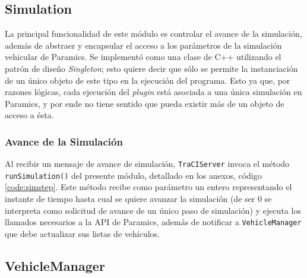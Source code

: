\subsection{Simulation}\label{sec:simulation}

La principal funcionalidad de este módulo es controlar el avance de la simulación, además de abstraer y encapsular el acceso a los parámetros de la simulación vehicular de Paramics. Se implementó como una clase de C++ utilizando el patrón de diseño \emph{Singleton}; esto quiere decir que sólo se permite la instanciación de un único objeto de este tipo en la ejecución del programa. Esto ya que, por razones lógicas, cada ejecución del \emph{plugin} está asociada a una única simulación en Paramics, y por ende no tiene sentido que pueda existir más de un objeto de acceso a ésta.

\subsubsection{Avance de la Simulación}

Al recibir un mensaje de avance de simulación, \texttt{TraCIServer} invoca el método \texttt{runSimulation()} del presente módulo, detallado en los anexos, código \ref{code:simstep}. Este método recibe como parámetro un entero representando el instante de tiempo hasta cual se quiere avanzar la simulación (de ser $0$ se interpreta como solicitud de avance de un único paso de simulación) y ejecuta los llamados necesarios a la API de Paramics, además de notificar a \texttt{VehicleManager} que debe actualizar sus listas de vehículos.

\subsection{VehicleManager}\label{sec:vehiclemanager}